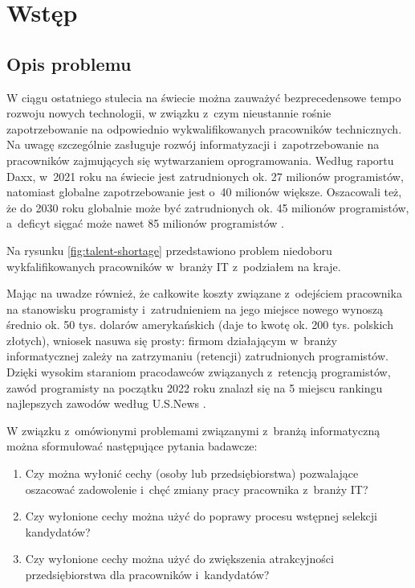 
\chapter*{Wstęp}\label{ch:admission}

\section*{Opis problemu}\label{sec:admission:problem-description}

W ciągu ostatniego stulecia na świecie można zauważyć bezprecedensowe tempo rozwoju nowych technologii,
w związku z~czym nieustannie rośnie zapotrzebowanie na odpowiednio wykwalifikowanych pracowników technicznych.
Na uwagę szczególnie zasługuje rozwój informatyzacji i~zapotrzebowanie na pracowników zajmujących się wytwarzaniem oprogramowania.
Według raportu Daxx, w~2021 roku na świecie jest zatrudnionych ok. 27 milionów programistów, natomiast globalne zapotrzebowanie jest o~40 milionów większe.
Oszacowali też, że do 2030 roku globalnie może być zatrudnionych ok. 45 milionów programistów, a~deficyt sięgać może nawet 85 milionów programistów \cite{daxx-2021}.

Na rysunku \ref{fig:talent-shortage} przedstawiono problem niedoboru wykfalifikowanych pracowników w~branży IT z~podziałem na kraje.


Mając na uwadze również, że całkowite koszty związane z~odejściem pracownika na stanowisku programisty i~zatrudnieniem na jego miejsce nowego
wynoszą średnio ok. 50 tys. dolarów amerykańskich \cite{hairing-dev-2021} (daje to kwotę ok. 200 tys. polskich złotych), wniosek nasuwa się prosty:
firmom działającym w~branży informatycznej zależy na zatrzymaniu (retencji) zatrudnionych programistów.
Dzięki wysokim staraniom pracodawców związanych z~retencją programistów,
zawód programisty na początku 2022 roku znalazł się na 5 miejscu rankingu najlepszych zawodów według U.S.News \cite{us-news-2022}.

W związku z~omówionymi problemami związanymi z~branżą informatyczną można sformułować następujące pytania badawcze:
\begin{enumerate}
    \item Czy można wyłonić cechy (osoby lub przedsiębiorstwa) pozwalające oszacować zadowolenie i~chęć zmiany pracy pracownika z~branży IT?
    \item Czy wyłonione cechy można użyć do poprawy procesu wstępnej selekcji kandydatów?
    \item Czy wyłonione cechy można użyć do zwiększenia atrakcyjności przedsiębiorstwa dla pracowników i~kandydatów?
\end{enumerate}

